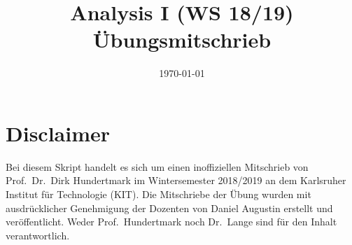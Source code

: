 \documentclass[12pt,a4paper,titlepage,draft]{article}
\begin{document}
	\title{Analysis I (WS 18/19)\\ {\normalsize Übungsmitschrieb}}
	\date{\today}
	\maketitle
	
	\section*{Disclaimer}
	Bei diesem Skript handelt es sich um einen inoffiziellen Mitschrieb 
	 von Prof.\ Dr.\ Dirk Hundertmark im Wintersemester 
	2018/2019 an dem Karlsruher Institut für Technologie (KIT).	Die 
	Mitschriebe der Übung wurden mit ausdrücklicher	Genehmigung der 
	Dozenten von Daniel Augustin erstellt und veröffentlicht.
	Weder Prof.\ Hundertmark noch Dr.\ Lange sind für den Inhalt 
	verantwortlich.
	\newpage

	\tableofcontents
	\newpage	
\end{document}
